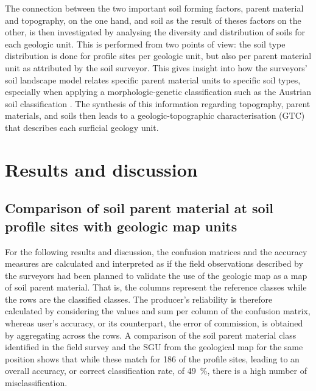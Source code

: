 \documentclass[preprint,12pt,authoryear]{elsarticle}
\begin{document}
The connection between the two important soil forming factors, parent material and topography, on the one hand, and soil as the result of theses factors on the other, is then investigated by analysing the diversity and distribution of soils for each geologic unit. This is performed from two points of view: the soil type distribution is done for profile sites per geologic unit, but also per parent material unit as attributed by the soil surveyor. This gives insight into how the surveyors' soil landscape model relates specific parent material units to specific soil types, especially when applying a morphologic-genetic classification such as the Austrian soil classification \citep{Nestroy2000,Nestroy2011}. The synthesis of this information regarding topography, parent materials, and soils then leads to a geologic-topographic characterisation (GTC) that describes each surficial geology unit. 





\clearpage
\section{Results and discussion}
\subsection{Comparison of soil parent material at soil profile sites with geologic map units}
For the following results and discussion,  the confusion matrices and the accuracy measures are calculated and interpreted as if the field observations described by the surveyors had been planned to validate the use of the geologic map as a map of soil parent material. That is, the columns represent the reference classes while the rows are the classified classes. The producer's reliability is therefore calculated by considering the values and sum per column of the confusion matrix, whereas user's accuracy, or its counterpart, the error of commission, is obtained by aggregating across the rows.
A comparison of the soil parent material class identified in the field survey and the SGU from the geological map for the same position shows that while these match for 186 of the profile sites, leading to an overall accuracy, or correct classification rate, of 49~\%, there is a high number of misclassification. 
\end{document}
